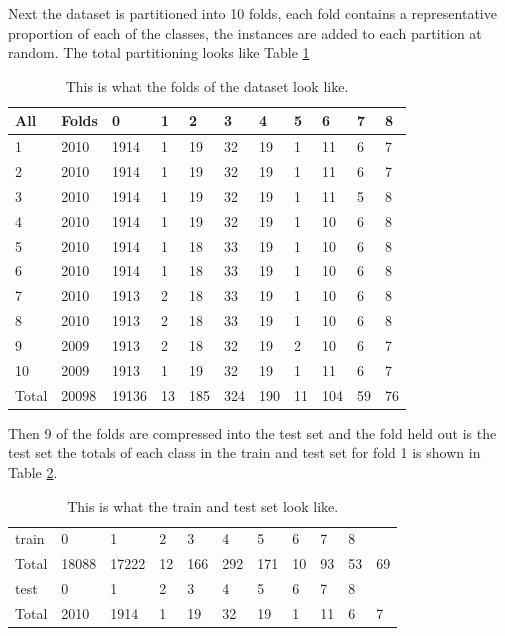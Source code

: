 \documentclass[ms]{nuthesis}
\begin{document}
\par Next the dataset is partitioned into 10 folds, each fold contains a representative proportion
of each of the classes, the instances are added to each partition at random. The total partitioning
looks like Table \ref{tab:partitions}
\FloatBarrier
\begin{table}[h]
  \centering
  \begin{tabular}{|l||l||l||l||l||l||l||l||l||l||l|}\toprule
    All & Folds & 0 & 1 & 2 & 3 & 4 & 5 & 6 & 7 & 8 \\ \midrule
    1 & 2010 & 1914 & 1 & 19 & 32 & 19 & 1 & 11 & 6 & 7 \\
    2 & 2010 & 1914 & 1 & 19 & 32 & 19 & 1 & 11 & 6 & 7 \\
    3 & 2010 & 1914 & 1 & 19 & 32 & 19 & 1 & 11 & 5 & 8 \\
    4 & 2010 & 1914 & 1 & 19 & 32 & 19 & 1 & 10 & 6 & 8 \\
    5 & 2010 & 1914 & 1 & 18 & 33 & 19 & 1 & 10 & 6 & 8 \\
    6 & 2010 & 1914 & 1 & 18 & 33 & 19 & 1 & 10 & 6 & 8 \\
    7 & 2010 & 1913 & 2 & 18 & 33 & 19 & 1 & 10 & 6 & 8 \\
    8 & 2010 & 1913 & 2 & 18 & 33 & 19 & 1 & 10 & 6 & 8 \\
    9 & 2009 & 1913 & 2 & 18 & 32 & 19 & 2 & 10 & 6 & 7 \\
    10 & 2009 & 1913 & 1 & 19 & 32 & 19 & 1 & 11 & 6 & 7 \\ \midrule
    Total & 20098 & 19136 & 13 & 185 & 324 & 190 & 11 & 104 & 59 & 76 \\
 \bottomrule
  \end{tabular}
  \caption{This is what the folds of the dataset look like.}
  \label{tab:partitions}
\end{table}
\FloatBarrier

\par Then 9 of the folds are compressed into the test set and the fold held out
is the test set the totals of each class in the train and test set for fold 1 is shown in
Table \ref{tab:TrainTest}.


\FloatBarrier
\begin{table}[h]
  \centering
  \begin{tabular}{|l||l||l||l||l||l||l||l||l||l||l|}\toprule
    train & 0 & 1 & 2 & 3 & 4 & 5 & 6 & 7 & 8 \\
    Total & 18088 & 17222 & 12 & 166 & 292 & 171 & 10 & 93 & 53 & 69 \\ \midrule
    test & 0 & 1 & 2 & 3 & 4 & 5 & 6 & 7 & 8 \\
    Total & 2010 & 1914 & 1 & 19 & 32 & 19 & 1 & 11 & 6 & 7 \\
 \bottomrule
  \end{tabular}
  \caption{This is what the train and test set look like.}
  \label{tab:TrainTest}
\end{table}
\FloatBarrier
\end{document}
